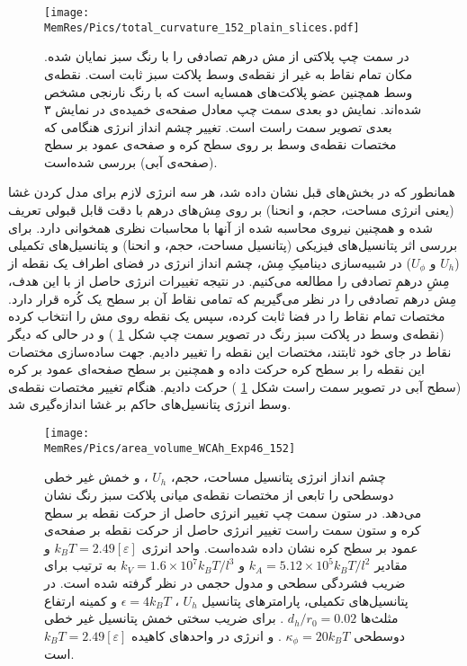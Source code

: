 \begin{figure}[htbp]
\begin{center}
\texttt{[image: \\MemRes/Pics/total\_curvature\_152\_plain\_slices.pdf]}
\caption{
در سمت چپ پلاکتی از مش درهم تصادفی را با رنگ سبز نمایان شده. مکان تمام نقاط به غیر از نقطه‌ی وسط پلاکت سبز ثابت است. نقطه‌ی وسط همچنین عضو پلاکت‌های همسایه‌ است که با رنگ نارنجی مشخص شده‌اند. نمایش دو بعدی سمت چپ معادل صفحه‌ی خمیده‌ی در نمایش ۳ بعدی تصویر سمت راست است. تغییر چشم انداز انرژی هنگامی که مختصات نقطه‌ی وسط بر روی سطح کره و صفحه‌ی عمود بر سطح (صفحه‌ی آبی) بررسی شده‌است.
}
\label{fig:PlacketRepresentaion}
\end{center}
\end{figure}

همانطور که در بخش‌های قبل نشان داده شد، هر سه انرژی لازم برای مدل کردن غشا (یعنی انرژی مساحت، حجم، و انحنا) بر روی مِش‌های درهم با دقت قابل قبولی تعریف شده و همچنین نیروی محاسبه شده از آنها با محاسبات نظری همخوانی دارد. برای بررسی اثر پتانسیل‌های فیزیکی (پتانسیل مساحت، حجم، و انحنا) و پتانسیل‌های تکمیلی 
($U_h$
و
$U_\phi$)
 در شبیه‌سازی دینامیکِ مِش، چشم انداز انرژی در فضای اطراف یک نقطه از مِشِ درهمِ تصادفی را مطالعه می‌کنیم. در نتیجه تغییرات انرژی حاصل از  با این هدف، مِش درهم تصادفی را در نظر می‌گیریم که تمامی نقاط آن بر سطح یک کُره‌ قرار دارد. مختصات تمام نقاط را در فضا ثابت کرده، سپس یک نقطه روی مش را انتخاب کرده (نقطه‌ی وسط در پلاکت سبز رنگ در تصویر سمت چپ شکل
\ref{fig:PlacketRepresentaion}
) و در حالی که دیگر نقاط در جای خود ثابتند، مختصات این نقطه را تغییر دادیم. جهت ساده‌سازی مختصات این نقطه را  بر سطح کره‌ حرکت داده و همچنین بر سطح صفحه‌ای عمود بر کره (سطح آبی در تصویر سمت راست شکل
\ref{fig:PlacketRepresentaion}
) حرکت دادیم. هنگام تغییر مختصات نقطه‌ی وسط انرژی پتانسیل‌های حاکم بر غشا اندازه‌گیری شد. 




\begin{figure}[htbp]
\begin{center}
\texttt{[image: \\MemRes/Pics/area\_volume\_WCAh\_Exp46\_152]}
\caption{
چشم انداز انرژی پتانسیل مساحت، حجم،
$U_h$
، و خمش غیر خطی دوسطحی را تابعی از مختصات نقطه‌ی میانی پلاکت سبز رنگ نشان می‌دهد. در ستون سمت چپ تغییر انرژی حاصل از حرکت نقطه بر سطح کره و ستون سمت راست تغییر انرژی حاصل از حرکت نقطه بر صفحه‌ی عمود بر سطح کره  نشان داده شده‌است. واحد انرژی
$k_BT=2.49[\varepsilon]$
 و مقادیر 
 $k_A=5.12\times10^5k_BT/l^2$
 و
 $k_V=1.6\times10^7k_BT/l^3$
 به ترتیب برای ضریب فشردگی سطحی و مدول حجمی در نظر گرفته شده است. در پتانسیل‌های تکمیلی، پارامتر‌های پتانسیل 
 $U_h$
 ، 
$\epsilon=4k_BT$
 و کمینه ارتفاع مثلث‌ها 
 $d_h/r_0=0.02$ 
 . برای ضریب سختی خمش پتانسیل غیر خطی دوسطحی 
 $\kappa_{\phi}=20k_BT$
 . و انرژی در واحد‌های کاهیده
 $k_BT=2.49[\varepsilon]$
 است.
}
\label{fig:PlacketEnergyArea}
\end{center}
\end{figure}


